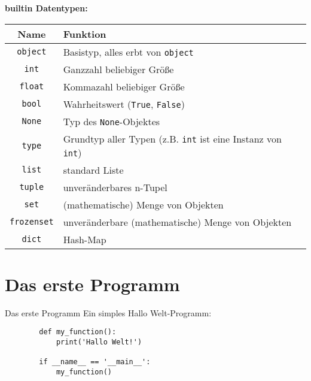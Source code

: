 \documentclass[]{tudbeamer}
\begin{document}
\begin{frame}[fragile]
	\textbf{builtin Datentypen:}\\
	\begin{tabular}{c|l}
		Name & Funktion \\ \hline
		\lstinline{object} & Basistyp, alles erbt von \lstinline{object} \\
		\lstinline{int} & Ganzzahl \glqq{}beliebiger\grqq{} Grö\ss{}e \\
		\lstinline{float} & Kommazahl \glqq{}beliebiger\grqq{} Grö\ss{}e \\
		\lstinline{bool} & Wahrheitswert (\lstinline{True}, \lstinline{False})\\
		\lstinline{None} & Typ des \lstinline{None}-Objektes \\
		\lstinline{type} & Grundtyp aller Typen (z.B. \lstinline{int} ist eine Instanz von \lstinline{int}) \\
		\lstinline{list} & standard Liste \\
		\lstinline{tuple} & unveränderbares n-Tupel \\
		\lstinline{set} & (mathematische) Menge von Objekten \\
		\lstinline{frozenset} & unveränderbare (mathematische) Menge von Objekten \\
		\lstinline{dict} & Hash-Map \\
	\end{tabular}
\end{frame}


\section{Das erste Programm}
\begin{frame}[fragile]{Das erste Programm}
	Ein simples \glqq{}Hallo Welt\grqq{}-Programm:\\[.5cm]
	\begin{lstlisting}
		def my_function():
		    print('Hallo Welt!')
		
		if __name__ == '__main__':
		    my_function()
	\end{lstlisting}
\end{frame}
\end{document}
